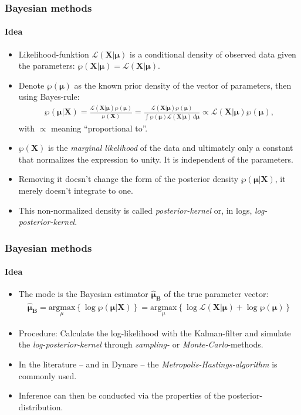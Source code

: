 \documentclass{beamer} %
\begin{document}
\begin{frame}\frametitle{Bayesian methods}\framesubtitle{Idea}
  \begin{itemize}
     \item Likelihood-funktion $\mathcal{L}(\mathbf{X}|\boldsymbol{\mu})$ is a conditional density of observed data given the parameters:
$\wp(\mathbf{X}|\boldsymbol{\mu})=\mathcal{L}(\mathbf{X}|\boldsymbol{\mu})$.
     \item Denote $\wp(\boldsymbol{\mu})$ as the known prior density of the vector of parameters, then using Bayes-rule:
\begin{align*}
    \wp(\boldsymbol{\mu}|\mathbf{X}) = \frac{\mathcal{L}(\mathbf{X}|\boldsymbol{\mu})\wp(\boldsymbol{\mu})}{\wp(\mathbf{X})} =  \frac{\mathcal{L}(\mathbf{X}|\boldsymbol{\mu})\wp(\boldsymbol{\mu})}{\int \wp(\boldsymbol{\mu}) \mathcal{L}(\mathbf{X|\boldsymbol{\mu}}) ~d\boldsymbol{\mu}} \propto \mathcal{L}(\mathbf{X}|\boldsymbol{\mu})\wp(\boldsymbol{\mu}),
\end{align*}
with $\propto$ meaning \enquote{proportional to}.

     \item $\wp(\mathbf{X})$ is the \emph{marginal likelihood} of the data and ultimately only a constant that normalizes the expression to unity. It is independent of the parameters.
    \item Removing it doesn't change the form of the posterior density $\wp(\boldsymbol{\mu}|\mathbf{X})$, it merely doesn't integrate to one.
     \item This non-normalized density is called \emph{posterior-kernel} or, in logs, \emph{log-posterior-kernel}.
   \end{itemize}
\end{frame}

\begin{frame}\frametitle{Bayesian methods}\framesubtitle{Idea}
  \begin{itemize}
    \item The mode is the Bayesian estimator $\boldsymbol{\widehat{\mu}_B}$ of the true parameter vector:
\begin{align*}
    \boldsymbol{\widehat{\mu}_B} = \underset{\mu}{\text{argmax}}\left\{\log{\wp(\boldsymbol{\mu}|\mathbf{X})}\right\} = \underset{\mu}{\text{argmax}}\left\{ \log{\mathcal{L}(\mathbf{X}|\boldsymbol{\mu})} + \log{\wp(\boldsymbol{\mu})} \right\}
\end{align*}
    \item Procedure: Calculate the log-likelihood with the Kalman-filter and simulate the \emph{log-posterior-kernel} through \emph{sampling-} or \emph{Monte-Carlo}-methods.
    \item  In the literature -- and in Dynare -- the \emph{Metropolis-Hastings-algorithm} is commonly used.
    \item  Inference can then be conducted via the properties of the posterior-distribution.
  \end{itemize}
\end{frame}
\end{document}

